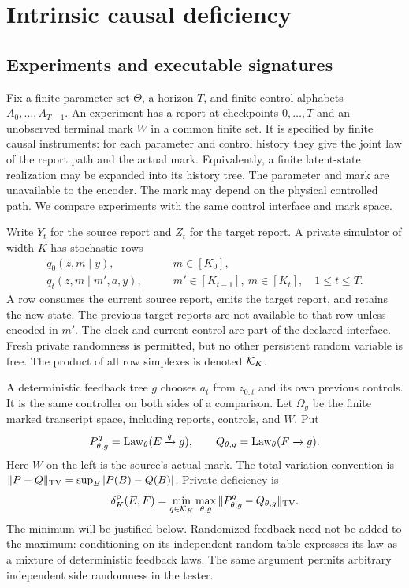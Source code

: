 \section{Intrinsic causal deficiency}\label{sec:v13-deficiency}
\subsection{Experiments and executable signatures}
Fix a finite parameter set $\Theta$, a horizon $T$, and finite control
alphabets $A_0,\ldots,A_{T-1}$. An experiment has a report at checkpoints
$0,\ldots,T$ and an unobserved terminal mark $W$ in a common finite set.
It is specified by finite causal instruments: for each parameter and
control history they give the joint law of the report path and the
actual mark. Equivalently, a finite latent-state realization may be
expanded into its history tree. The parameter and mark are unavailable
to the encoder. The mark may depend on the physical controlled path.
We compare experiments with the same control interface and mark space.

Write $Y_t$ for the source report and $Z_t$ for the target report. A
private simulator of width $K$ has stochastic rows
\begin{align}
 q_0(z,m\mid y),&\qquad m\in[K_0],\label{eq:v13-rows}\\
 q_t(z,m\mid m',a,y),&\qquad
       m'\in[K_{t-1}],\ m\in[K_t],\quad 1\le t\le T.\nonumber
\end{align}
A row consumes the current source report, emits the target report, and
retains the new state. The previous target reports are not available to
that row unless encoded in $m'$. The clock and current control are part
of the declared interface. Fresh private randomness is permitted, but
no other persistent random variable is free. The product of all row
simplexes is denoted $\mathcal K_K$.

A deterministic feedback tree $g$ chooses $a_t$ from $z_{0:t}$ and its
own previous controls. It is the same controller on both sides of a
comparison. Let $\Omega_g$ be the finite marked transcript space, including
reports, controls, and $W$. Put
\[
 P_{\theta,g}^q=\operatorname{Law}_\theta(E\xrightarrow{q}g),\qquad
 Q_{\theta,g}=\operatorname{Law}_\theta(F\xrightarrow{}g).
\]
Here $W$ on the left is the source's actual mark. The total variation
convention is $\|P-Q\|_{\rm TV}=\sup_B|P(B)-Q(B)|$.
Private deficiency is
\begin{equation}\label{eq:v13-private}
 \delta^{\rm p}_K(E,F)=\min_{q\in\mathcal K_K}
       \max_{\theta,g}\|P_{\theta,g}^q-Q_{\theta,g}\|_{\rm TV}.
\end{equation}
The minimum will be justified below. Randomized feedback need not be
added to the maximum: conditioning on its independent random table
expresses its law as a mixture of deterministic feedback laws. The same
argument permits arbitrary independent side randomness in the tester.

